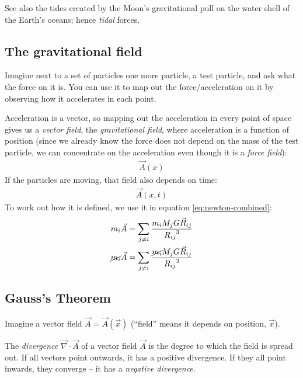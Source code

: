 \documentclass[pagesize,headsepline,10pt,parskip=half,BCOR=12mm]{scrreprt}
\begin{document}
          See also the tides created by the Moon's gravitational
          pull on the water shell of the Earth's oceans; hence
          \emph{tidal} forces.

      \subsection{The gravitational field}
        Imagine next to a set of particles one more particle, a
        test particle, and ask what the force on it is. You can use
        it to map out the force/acceleration on it by observing how
        it accelerates in each point.

        Acceleration is a vector, so mapping out the acceleration
        in every point of space gives us a \emph{vector field}, the
        \emph{gravitational field}, where acceleration is a
        function of position (since we already know the force does
        not depend on the mass of the test particle, we can
        concentrate on the acceleration even though it is a
        \emph{force field}):
        \begin{align*}
          \vec A(x)
        \end{align*}
        If the particles are moving, that field also depends on
        time:
        \begin{align*}
          \vec A(x, t)
        \end{align*}
        To work out how it is defined, we use it in equation
        \ref{eq:newton-combined}:
        \begin{align}
          m_i \vec A &= \sum_{j \neq i}{\frac{m_i
          M_jG\vec R_{ij}}{{R_{ij}}^3}} \\
          \cancel{m_i} \vec A &= \sum_{j \neq i}{\frac{\cancel{m_i}
          M_jG\vec R_{ij}}{{R_{ij}}^3}}
        \end{align}

      \subsection{Gauss's Theorem}
        Imagine a vector field $\vec A = \vec A(\vec x)$ (``field''
        means it depends on position, $\vec x$).

        The \emph{divergence} $ \vec \nabla \cdot \vec A$ of a vector
        field $\vec A$ is the degree to which the field is spread
        out.
        If all vectors point outwards, it has a positive divergence. If they all point
        inwards, they converge -- it has a \emph{negative
        divergence}.
\end{document}
